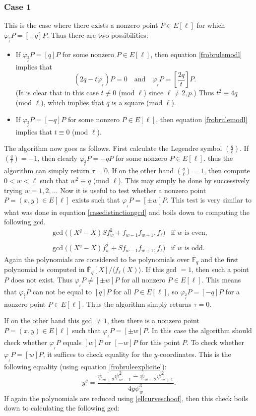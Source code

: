 \documentclass{article}
\numberwithin{equation}{section}
\theoremstyle{definition}
\newcommand{\FFCL}[1]{{\bar {\mathbb F}}_{#1}} %
\newcommand{\grgen}[1]{\langle #1 \rangle} %
\newcommand{\frob}[1][]{\varphi_{#1}} %
\newcommand{\leg}[2]{\left( \frac{#1}{#2}\right)} %
\begin{document}
\subsubsection{Case 1}\label{case1}
This is the case where there exists a nonzero point $P \in E[\ell]$ for which $\frob_\ell^2P=[\pm q]P$. Thus there are two possibilities: 
\begin{itemize} 
\item If $\frob_\ell^2 P = [q]P$ for some nonzero $P \in E[\ell]$, then equation \ref{frobrulemodl} implies that $$ (2q-t\frob_\ell)P = 0 \quad \text{and} \quad \frob_\ell P = \left[\frac{2q}{t}\right] P. $$ (It is clear that in this case $t \not \equiv 0$ (mod $\ell$) since $\ell \neq 2,p$.) Thus $t^2 \equiv 4q$ (mod $\ell$), which implies that $q$ is a square (mod $\ell$).
\item If $\frob_\ell^2 P = [-q]P$ for some nonzero $P \in E[\ell]$, then equation \ref{frobrulemodl} implies that  $t \equiv 0$ (mod $\ell$). 
\end{itemize}
The algorithm now goes as follows. First calculate the Legendre symbol $\leg{q}{\ell}$. If $\leg{q}{\ell}=-1$, then clearly $\frob_\ell^2 P = -qP$ for some nonzero $P \in E[\ell]$. thus the algorithm can simply return $\tau=0$. If on the other hand $\leg{q}{\ell}=1$, then compute $0<w<\ell$ such that $w^2 \equiv q$ (mod $\ell$). This may simply be done by successively trying $w=1,2,\ldots$ Now it is useful to test whether a nonzero point $P=(x,y)\in E[\ell]$ exists such that $\frob_\ell P = [\pm w] P$. This test is very similar to what was done in equation \ref{casedistinctiongcd} and boils down to computing the following gcd.
$$ \begin{array}{ll} \gcd\big((X^q -X)Sf_w^2 + f_{w-1}f_{w+1},f_\ell\big) &\text{if $w$ is even,}\\ \\ \gcd \big((X^q-X) f_w^2 + Sf_{w-1}f_{w+1},f_\ell\big) &\text{if $w$ is odd.} \end{array} $$
Again the polynomials are considered to be polynomials over $\FFCL{q}$ and the first polynomial is computed in $\FFCL{q}[X]/\grgen{f_\ell(X)}$. If this gcd $=1$, then such a point $P$ does not exist. Thus $\frob_\ell P \neq [\pm w] P$ for all nonzero $P \in E[\ell]$. This means that $\frob_\ell^2P$ can not be equal to $[q]P$ for all $P \in E[\ell]$, so $\frob_\ell^2 P = [-q]P$ for a nonzero point $P \in E[\ell]$. Thus the algorithm simply returns $\tau = 0$. \par
If on the other hand this gcd $\neq 1$, then there is a nonzero point $P=(x,y) \in E[\ell]$ such that $\frob_\ell P = [\pm w]P$. In this case the algorithm should check whether $\frob_\ell P$ equals $[w]P$ or $[-w]P$ for this point $P$. To check whether $\frob_\ell P = [w]P$, it suffices to check equality for the $y$-coordinates. This is the following equality (using equation \ref{frobruleexplicite}): $$y^q=\frac{\psi_{w+2}\psi_{w-1}^2-\psi_{w-2}\psi_{w+1}^2}{4y\psi_w^3}.$$ If again the polynomials are reduced using \ref{ellcurveschoof}, then this check boils down to calculating the following gcd:
\end{document}
